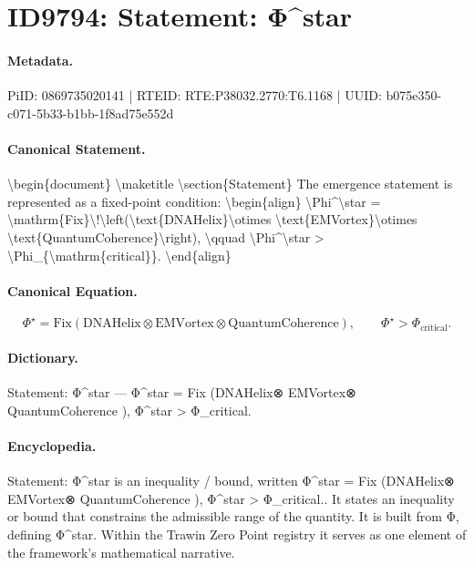 \section*{ID9794: Statement: Φ\textasciicircum{}star}
\paragraph{Metadata.}
PiID: 0869735020141 | RTEID: RTE:P38032.2770:T6.1168 | UUID: b075e350-c071-5b33-b1bb-1f8ad75e552d

\paragraph{Canonical Statement.}
\textbackslash{}begin\{document\} \textbackslash{}maketitle \textbackslash{}section\{Statement\} The emergence statement is represented as a fixed-point condition: \textbackslash{}begin\{align\} \textbackslash{}Phi\textasciicircum{}\textbackslash{}star = \textbackslash{}mathrm\{Fix\}\textbackslash{}!\textbackslash{}left(\textbackslash{}text\{DNAHelix\}\textbackslash{}otimes \textbackslash{}text\{EMVortex\}\textbackslash{}otimes \textbackslash{}text\{QuantumCoherence\}\textbackslash{}right), \textbackslash{}qquad \textbackslash{}Phi\textasciicircum{}\textbackslash{}star > \textbackslash{}Phi\_\{\textbackslash{}mathrm\{critical\}\}. \textbackslash{}end\{align\}

\paragraph{Canonical Equation.}
\[
\Phi^\star = \mathrm{Fix}\!\left(\text{DNAHelix}\otimes \text{EMVortex}\otimes \text{QuantumCoherence}\right), \qquad \Phi^\star > \Phi_{\mathrm{critical}}.
\]

\paragraph{Dictionary.}
Statement: Φ\textasciicircum{}star — Φ\textasciicircum{}star = Fix (DNAHelix⊗ EMVortex⊗ QuantumCoherence ), Φ\textasciicircum{}star > Φ\_critical.

\paragraph{Encyclopedia.}
Statement: Φ\textasciicircum{}star is an inequality / bound, written Φ\textasciicircum{}star = Fix (DNAHelix⊗ EMVortex⊗ QuantumCoherence ), Φ\textasciicircum{}star > Φ\_critical.. It states an inequality or bound that constrains the admissible range of the quantity. It is built from Φ, defining Φ\textasciicircum{}star. Within the Trawin Zero Point registry it serves as one element of the framework's mathematical narrative.
